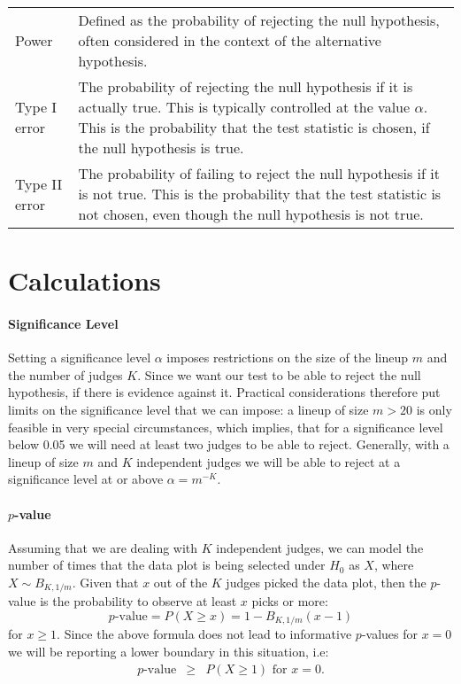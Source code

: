 \documentclass[11pt]{article}
\begin{document}
\begin{tabular}{lp{4.5in}}
Power & Defined as the probability of rejecting the null hypothesis, often considered in the context of the alternative hypothesis. \\%
Type I error & The probability of rejecting the null hypothesis if it is actually true. This is typically controlled at the value $\alpha$. This is the probability that the test statistic is chosen, if the null hypothesis is true.\\
Type II error & The probability of failing to reject the null hypothesis if it is not true. This is the probability that the test statistic is not chosen, even though the null hypothesis is not true.\\
\end{tabular}

\section{Calculations}
\paragraph{Significance Level}
Setting a significance level $\alpha$ imposes restrictions on the size of the lineup $m$ and the number of judges $K$. Since we want our test to be able to reject the null hypothesis, if there is evidence against it. Practical considerations therefore put limits on the significance level that we can impose: a lineup of size $m > 20$ is only feasible in very special circumstances, which implies, that for a significance level below 0.05 we will need at least two judges to be able to reject. Generally, with a lineup of size $m$ and $K$ independent judges we will be able to reject at a significance level at or above $\alpha = m^{-K}$.

\paragraph{$p$-value}
Assuming that we are dealing with $K$ independent judges, we can model the number of times that the data plot is being selected under $H_0$ as $X$, where $X \sim B_{K, 1/m}$. Given that $x$ out of the $K$ judges picked the data plot, then  the $p$-value is the probability to observe at least $x$ picks or more:
\[
p\text{-value}  =  P(X \ge x) = 1 - B_{K, 1/m} (x-1)
\]
for $x \ge 1$.
Since the above formula does not lead to informative $p$-values for  $x=0$ we will be reporting a lower boundary in this situation, i.e:
\begin{eqnarray*}
p\text{-value} &\ge& P(X \ge 1) \text{ for } x= 0.\\
\end{eqnarray*}
\end{document}
